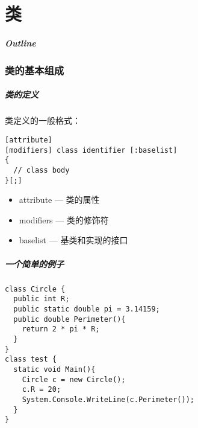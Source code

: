 
\part{类}
\begin{frame}
\frametitle{Outline}            %
\tableofcontents
\end{frame}

\section{类的基本组成}

\begin{frame}[fragile]
\frametitle{类的定义}
类定义的一般格式：
\begin{lstlisting}
[attribute]
[modifiers] class identifier [:baselist]
{
  // class body
}[;]
\end{lstlisting}
\begin{itemize}
\item attribute --- 类的属性
\item modifiers --- 类的修饰符
\item baselist  --- 基类和实现的接口
\end{itemize}
\end{frame}

\begin{frame}[fragile]
\frametitle{一个简单的例子}
\begin{lstlisting}
class Circle {
  public int R;
  public static double pi = 3.14159;
  public double Perimeter(){
    return 2 * pi * R;
  }
}
class test {
  static void Main(){
    Circle c = new Circle();
    c.R = 20;
    System.Console.WriteLine(c.Perimeter());
  }
}
\end{lstlisting}
\end{frame}




